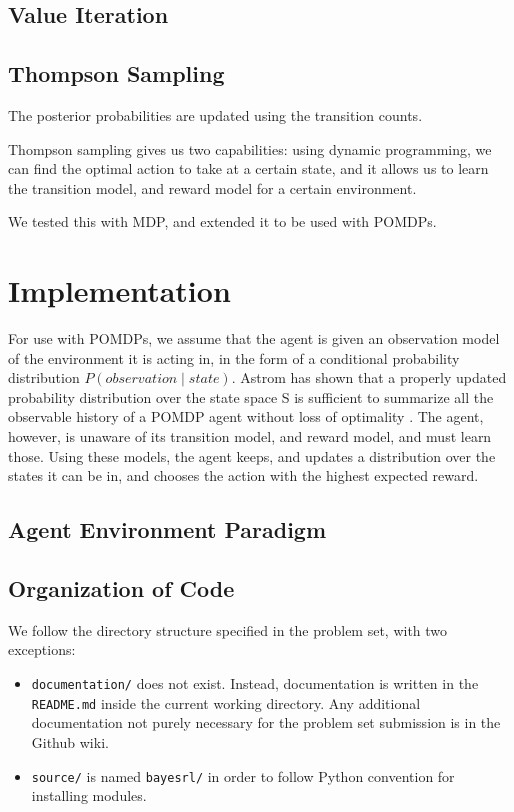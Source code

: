 \documentclass{pset}
\begin{document}
\subsection{Value Iteration}

\subsection{Thompson Sampling}

The posterior probabilities are updated using the transition counts.

Thompson sampling gives us two capabilities: using dynamic programming, we can
find the optimal action to take at a certain state, and it allows us to learn
the transition model, and reward model for a certain environment. 

We tested this with MDP, and extended it to be used with POMDPs.

\section{Implementation}
For use with POMDPs, we assume that the agent is given an observation model of the
environment it is acting in, in the form of a conditional probability distribution
$P(observation \mid state)$. Astrom has shown that a properly updated probability 
distribution over the state space S is sufficient to summarize all the observable 
history of a POMDP agent without loss of optimality \cite{astrom}. The agent, however, is unaware of its transition model, and
reward model, and must learn those. Using these models, the agent keeps, and
updates a distribution over the states it can be in, and chooses the action with
the highest expected reward.


\subsection{Agent Environment Paradigm}

\subsection{Organization of Code}
We follow the directory structure specified in the problem set, with two
exceptions:
\begin{itemize}
\item \texttt{documentation/} does not exist. Instead, documentation is written
in the \texttt{README.md} inside the current working directory. Any additional
documentation not purely necessary for the problem set submission is in the
Github wiki.
\item \texttt{source/} is named \texttt{bayesrl/} in order to follow Python
convention for installing modules.
\end{itemize}
\end{document}
